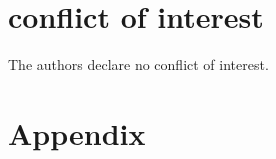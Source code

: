 \documentclass[alpha-refs]{wiley-article}
\theoremstyle{plain}%
\theoremstyle{definition}
\begin{document}
\section*{conflict of interest}
The authors declare no conflict of interest.

\printendnotes

% 




\section*{Appendix}
\end{document}
